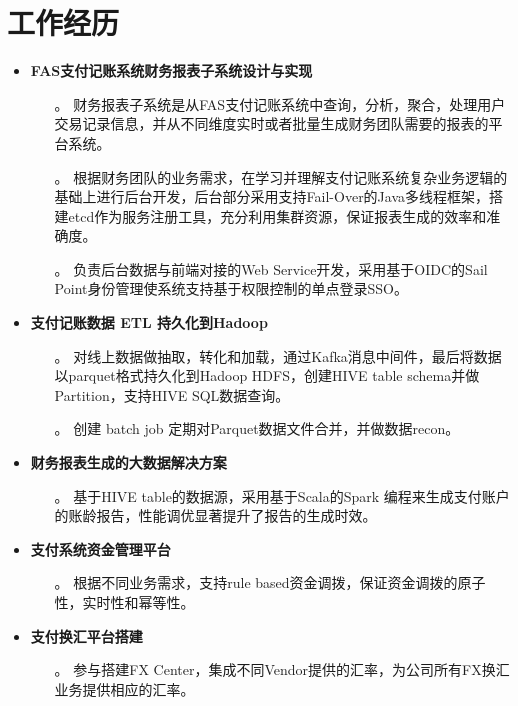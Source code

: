 \documentclass{resume}
\begin{document}
\section{工作经历}
\begin{itemize}
  \item \textbf{FAS支付记账系统财务报表子系统设计与实现}
    \begin{itemize}
      \item[。] 财务报表子系统是从FAS支付记账系统中查询，分析，聚合，处理用户交易记录信息，并从不同维度实时或者批量生成财务团队需要的报表的平台系统。
      \item[。] 根据财务团队的业务需求，在学习并理解支付记账系统复杂业务逻辑的基础上进行后台开发，后台部分采用支持Fail-Over的Java多线程框架，搭建etcd作为服务注册工具，充分利用集群资源，保证报表生成的效率和准确度。
      \item[。] 负责后台数据与前端对接的Web Service开发，采用基于OIDC的Sail Point身份管理使系统支持基于权限控制的单点登录SSO。
    \end{itemize}
  \item \textbf{支付记账数据 ETL 持久化到Hadoop}
    \begin{itemize}
      \item[。] 对线上数据做抽取，转化和加载，通过Kafka消息中间件，最后将数据以parquet格式持久化到Hadoop HDFS，创建HIVE table schema并做Partition，支持HIVE SQL数据查询。
      \item[。] 创建 batch job 定期对Parquet数据文件合并，并做数据recon。
    \end{itemize}
  \item \textbf{财务报表生成的大数据解决方案}
    \begin{itemize}
      \item[。] 基于HIVE table的数据源，采用基于Scala的Spark 编程来生成支付账户的账龄报告，性能调优显著提升了报告的生成时效。
    \end{itemize}
  \item \textbf{支付系统资金管理平台}
    \begin{itemize}
      \item[。] 根据不同业务需求，支持rule based资金调拨，保证资金调拨的原子性，实时性和幂等性。
    \end{itemize}
  \item \textbf{支付换汇平台搭建}
    \begin{itemize}
      \item[。] 参与搭建FX Center，集成不同Vendor提供的汇率，为公司所有FX换汇业务提供相应的汇率。

\end{itemize}
\end{itemize}
\end{document}
